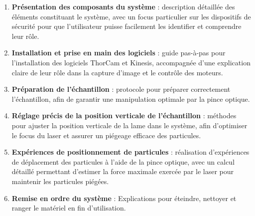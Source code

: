 \begin{enumerate}
    \item \textbf{Présentation des composants du système} : description détaillée des éléments constituant le système, avec un focus particulier sur les dispositifs de sécurité pour que l'utilisateur puisse facilement les identifier et comprendre leur rôle.

    \item \textbf{Installation et prise en main des logiciels} : guide pas-à-pas pour l'installation des logiciels ThorCam et Kinesis, accompagnée d'une explication claire de leur rôle dans la capture d'image et le contrôle des moteurs.

    \item \textbf{Préparation de l'échantillon} : protocole pour préparer correctement l'échantillon, afin de garantir une manipulation optimale par la pince optique.

    \item \textbf{Réglage précis de la position verticale de l'échantillon} : méthodes pour ajuster la position verticale de la lame dans le système, afin d'optimiser le focus du laser et assurer un piégeage efficace des particules.

    \item \textbf{Expériences de positionnement de particules} : réalisation d'expériences de déplacement des particules à l'aide de la pince optique, avec un calcul détaillé permettant d'estimer la force maximale exercée par le laser pour maintenir les particules piégées.

    \item \textbf{Remise en ordre du système} : Explications pour éteindre, nettoyer et ranger le matériel en fin d'utilisation.
\end{enumerate}